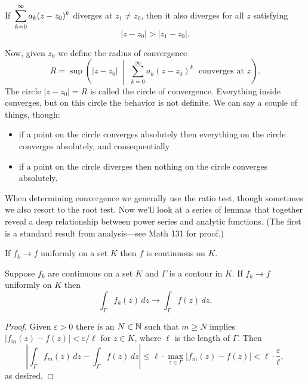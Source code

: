 \documentclass[../m136main.tex]{subfiles}
\begin{document}
\begin{corollary}[]
    \vspace{-4pt} If $\,\displaystyle \sum_{k=0}^{\infty} a_k (z - z_0)^{k}$ diverges at $z_1 \neq z_0$, then it also diverges for all $z$ satisfying   \vspace{-6pt}
    \[ |z - z_0| > |z_1 - z_0|. \]
\end{corollary}

Now, given $z_0$ we define the radius of convergence
\[ R = \sup \left( |z - z_0| \;\middle|\; \sum_{k=0}^{\infty} a_k(z - z_0)^k \;\text{ converges at $z$} \right). \]
The circle $|z - z_0| = R$ is called the circle of convergence.
Everything inside converges, but on this circle the behavior is not definite.
We can say a couple of things, though:
\begin{itemize}[topsep=0pt]
    \item if a point on the circle converges absolutely then everything on the circle converges absolutely, and consequentially
    \item if a point on the circle diverges then nothing on the circle converges absolutely.
\end{itemize}
When determining convergence we generally use the ratio test, though sometimes we also resort to the root test.
Now we'll look at a series of lemmas that together reveal a deep relationship between power series and analytic functions.
(The first is a standard result from analysis---see Math 131 for proof.)

\begin{lemma}[]
    If $f_k \to f$ uniformly on a set $K$ then $f$ is continuous on $K$.
\end{lemma}

\begin{lemma}[]
    Suppose $f_k$ are continuous on a set $K$ and $\Gamma$ is a contour in $K$.
    If $f_k \to f$ uniformly on $K$ then
    \[ \int_\Gamma f_k(z) \,dz \longrightarrow \int_\Gamma f(z) \,dz. \]
\end{lemma}

\begin{proof}
    Given $\varepsilon > 0$ there is an $N \in \mathbb{N}$ such that $m \geq N$ implies $|f_m(z) - f(z)| < \varepsilon / \ell$ for $z \in K$, where $\ell$ is the length of $\Gamma$.
    Then
    \[ \left| \int_\Gamma f_m(z) \,dz - \int_\Gamma f(z) \,dz \right| \leq \ell \cdot \max_{z \in \Gamma} |f_m(z) - f(z)| < \ell \cdot \frac{\varepsilon}{\ell}, \]
    as desired.
\end{proof}
\end{document}
